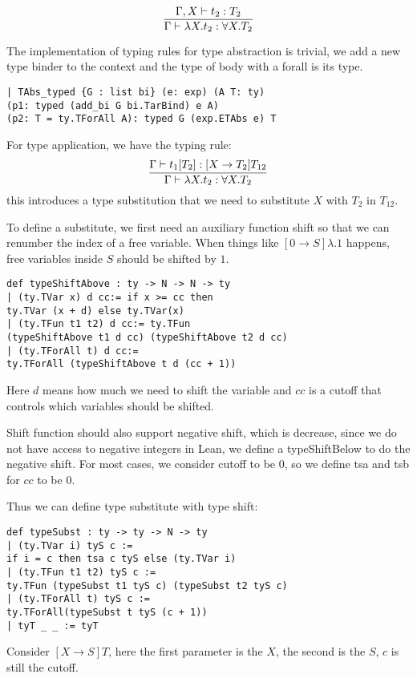 \documentclass[conference]{IEEEtran}
\begin{document}
\begin{equation}
	\infer{\Gamma\vdash \lambda X.t_2:\forall X.T_2}
	{\Gamma,X\vdash t_2:T_2}
	\label{eq:TITAbs}
\end{equation}

The implementation of typing rules for type abstraction is trivial,
we add a new type binder to the context and the type of body
with a forall is its type.

\begin{lstlisting}
| TAbs_typed {G : list bi} (e: exp) (A T: ty) 
(p1: typed (add_bi G bi.TarBind) e A) 
(p2: T = ty.TForAll A): typed G (exp.ETAbs e) T
\end{lstlisting}

For type application, we have the typing rule:
\begin{equation}
	\infer{\Gamma\vdash \lambda X.t_2:\forall X.T_2}
	{\Gamma\vdash t_1[T_2]:[X\to T_2]T_{12}}
	\label{eq:TITApp}
\end{equation}
this introduces a type substitution that we need to
substitute $X$ with $T_2$ in $T_{12}$.

To define a substitute, we first need an auxiliary function
shift so that we can renumber the index of a free variable.
When things like $[0\to S]\lambda.1$ happens, free variables
inside $S$ should be shifted by $1$.
\begin{lstlisting}
def typeShiftAbove : ty -> N -> N -> ty
| (ty.TVar x) d cc:= if x >= cc then
ty.TVar (x + d) else ty.TVar(x)
| (ty.TFun t1 t2) d cc:= ty.TFun
(typeShiftAbove t1 d cc) (typeShiftAbove t2 d cc)
| (ty.TForAll t) d cc:= 
ty.TForAll (typeShiftAbove t d (cc + 1))
\end{lstlisting}
Here $d$ means how much we need to shift the variable and
$cc$ is a cutoff that controls which variables
should be shifted.

Shift function should also support negative shift, which is
decrease, since we do not have access to negative integers
in Lean, we define a typeShiftBelow to do the negative shift.
For most cases, we consider cutoff to be 0, so we define tsa
and tsb for $cc$ to be 0.

Thus we can define type substitute with type shift:
\begin{lstlisting}
def typeSubst : ty -> ty -> N -> ty
| (ty.TVar i) tyS c := 
if i = c then tsa c tyS else (ty.TVar i)
| (ty.TFun t1 t2) tyS c := 
ty.TFun (typeSubst t1 tyS c) (typeSubst t2 tyS c)
| (ty.TForAll t) tyS c := 
ty.TForAll(typeSubst t tyS (c + 1))
| tyT _ _ := tyT

\end{lstlisting}
Consider $[X\to S]T$, here the first parameter is the $X$,
the second is the $S$, $c$ is still the cutoff.
\end{document}
